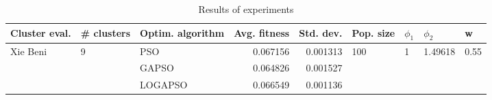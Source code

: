 \begin{table}
\centering
\caption{Results of experiments}
\begin{tabular}{lllrrllll}
\toprule
            Cluster eval. &        \# clusters & Optim. algorithm &  Avg. fitness &  Std. dev. &            Pop. size &         $\phi_{1}$ &               $\phi_{2}$ &                     w \\
\midrule
\multirow{3}{*}{Xie Beni} & \multirow{3}{*}{9} &              PSO &      0.067156 &   0.001313 & \multirow{3}{*}{100} & \multirow{3}{*}{1} & \multirow{3}{*}{1.49618} & \multirow{3}{*}{0.55} \\
                          &                    &            GAPSO &      0.064826 &   0.001527 &                      &                    &                          &                       \\
                          &                    &          LOGAPSO &      0.066549 &   0.001136 &                      &                    &                          &                       \\
\bottomrule
\end{tabular}
\end{table}

